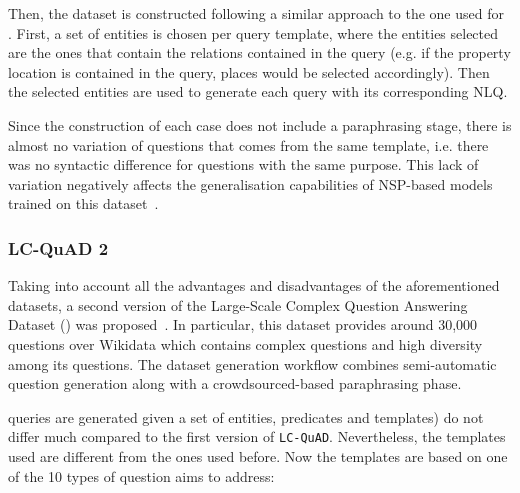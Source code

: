 Then, the dataset is constructed following a similar approach to the one used for \LCQuADone{}. 
First, a set of entities is chosen per query template, where the entities selected are the ones 
that contain the relations contained in the query (e.g. if the property location is contained 
in the query, places would be selected accordingly). Then the selected entities are used to 
generate each \SPARQL{} query with its corresponding NLQ. 

Since the construction of each case does not include a paraphrasing stage, there is almost no 
variation of questions that comes from the same template, i.e. there was no syntactic 
difference for questions with the same purpose. This lack of variation negatively affects the 
generalisation capabilities of NSP-based models trained on this dataset~\cite{qa:BerantL14}.

\subsubsection{LC-QuAD 2}
\label{cap2:qakg/benchmarkDatasets/lcquad2}
Taking into account all the advantages and disadvantages of the aforementioned datasets, a 
second version of the Large-Scale Complex Question Answering Dataset (\LCQuADtwo{}) was 
proposed~\cite{dataset:lcquad2-DubeyBA019}. In particular, this dataset provides around 30,000 
questions over Wikidata which contains complex questions and high diversity among its questions. 
The dataset generation workflow combines semi-automatic question generation along with a 
crowdsourced-based paraphrasing phase.

\SPARQL{} queries are generated given a set of entities, predicates and templates) do not differ 
much compared to the first version of \texttt{LC-QuAD}. Nevertheless, the \SPARQL{} templates used 
are different from the ones used before. Now the templates are based on one of the 10 types of 
question \LCQuADtwo{} aims to address:

